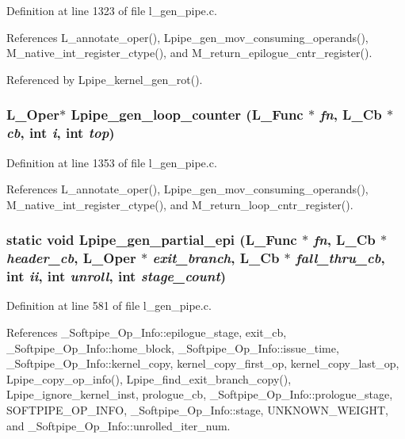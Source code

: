 Definition at line 1323 of file l\_\-gen\_\-pipe.c.

References L\_\-annotate\_\-oper(), Lpipe\_\-gen\_\-mov\_\-consuming\_\-operands(), M\_\-native\_\-int\_\-register\_\-ctype(), and M\_\-return\_\-epilogue\_\-cntr\_\-register().

Referenced by Lpipe\_\-kernel\_\-gen\_\-rot().
\subsubsection{\setlength{\rightskip}{0pt plus 5cm}L\_\-Oper$\ast$ Lpipe\_\-gen\_\-loop\_\-counter (L\_\-Func $\ast$ {\em fn}, L\_\-Cb $\ast$ {\em cb}, int {\em i}, int {\em top})}\label{l__gen__pipe_8c_33334914647461bc2c86d8527bee4f8e}




Definition at line 1353 of file l\_\-gen\_\-pipe.c.

References L\_\-annotate\_\-oper(), Lpipe\_\-gen\_\-mov\_\-consuming\_\-operands(), M\_\-native\_\-int\_\-register\_\-ctype(), and M\_\-return\_\-loop\_\-cntr\_\-register().
\subsubsection{\setlength{\rightskip}{0pt plus 5cm}static void Lpipe\_\-gen\_\-partial\_\-epi (L\_\-Func $\ast$ {\em fn}, L\_\-Cb $\ast$ {\em header\_\-cb}, L\_\-Oper $\ast$ {\em exit\_\-branch}, L\_\-Cb $\ast$ {\em fall\_\-thru\_\-cb}, int {\em ii}, int {\em unroll}, int {\em stage\_\-count})\hspace{0.3cm}{\tt  [static]}}\label{l__gen__pipe_8c_da8391af357e6351d97848a628f5fe5a}




Definition at line 581 of file l\_\-gen\_\-pipe.c.

References \_\-Softpipe\_\-Op\_\-Info::epilogue\_\-stage, exit\_\-cb, \_\-Softpipe\_\-Op\_\-Info::home\_\-block, \_\-Softpipe\_\-Op\_\-Info::issue\_\-time, \_\-Softpipe\_\-Op\_\-Info::kernel\_\-copy, kernel\_\-copy\_\-first\_\-op, kernel\_\-copy\_\-last\_\-op, Lpipe\_\-copy\_\-op\_\-info(), Lpipe\_\-find\_\-exit\_\-branch\_\-copy(), Lpipe\_\-ignore\_\-kernel\_\-inst, prologue\_\-cb, \_\-Softpipe\_\-Op\_\-Info::prologue\_\-stage, SOFTPIPE\_\-OP\_\-INFO, \_\-Softpipe\_\-Op\_\-Info::stage, UNKNOWN\_\-WEIGHT, and \_\-Softpipe\_\-Op\_\-Info::unrolled\_\-iter\_\-num.

